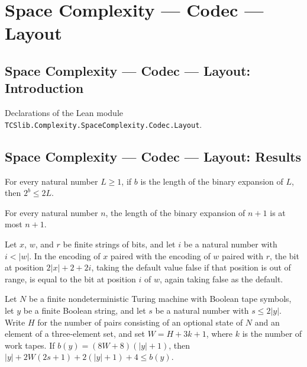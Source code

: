 \section{Space Complexity --- Codec --- Layout}
\subsection*{Space Complexity --- Codec --- Layout: Introduction}

Declarations of the Lean module \texttt{TCSlib.Complexity.SpaceComplexity.Codec.Layout}.

\subsection*{Space Complexity --- Codec --- Layout: Results}

\begin{lemma}
\label{Complexity.LogProg.two_pow_bits_le}
\leanok
{}
For every natural number $L\ge1$, if $b$ is the length of the binary expansion of $L$,
then $2^b\le 2L$.
\end{lemma}

\begin{lemma}
\label{Complexity.Codec.wP_le}
\leanok
{}
For every natural number $n$, the length of the binary expansion of $n+1$ is at most
$n+1$.
\end{lemma}

\begin{lemma}
\label{Complexity.Codec.getD_w}
\leanok
{}
Let $x$, $w$, and $r$ be finite strings of bits, and let $i$ be a natural number with
$i<|w|$. In the encoding of $x$ paired with the encoding of $w$ paired with $r$, the bit
at position $2|x|+2+2i$, taking the default value false if that position is out of
range, is equal to the bit at position $i$ of $w$, again taking false as the default.
\end{lemma}

\begin{lemma}
\label{Complexity.Codec.bnd_ge}
\leanok
{}
Let $N$ be a finite nondeterministic Turing machine with Boolean tape symbols, let $y$
be a finite Boolean string, and let $s$ be a natural number with $s\le 2|y|$. Write $H$
for the number of pairs consisting of an optional state of $N$ and an element of a
three-element set, and set $W=H+3k+1$, where $k$ is the number of work tapes. If
$b(y)=(8W+8)(|y|+1)$, then $|y|+2W(2s+1)+2(|y|+1)+4\le b(y)$.
\end{lemma}


